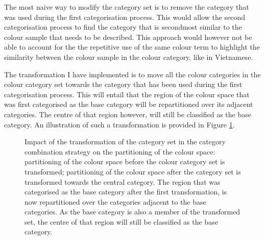 The most naive way to modify the category set is to remove the
category that was used during the first categorisation process. This
would allow the second categorisation process to find the category
that is secondmost similar to the colour sample that needs to be
described. This approach would however not be able to account for the
the repetitive use of the same colour term to highlight the similarity
between the colour sample in the colour category, like in Vietnamese.

The transformation I have implemented is to move all the colour
categories in the colour category set towards the category that has
been used during the first categorisation process. This will entail
that the region of the colour space that was first categorised as the
base category will be repartitioned over its adjacent categories. The
centre of that region however, will still be classified as the base
category. An illustration of such a transformation is provided in
Figure \ref{f:ccs-semantics-transformation}.

\begin{figure}[htbp]
\centering
{}
\caption[Impact of the transformation of the category set in the
category combination strategy on the partitioning of the colour
space]{Impact of the transformation of the category set in the
  category combination strategy on the partitioning of the
  colour space: 
  partitioning of the colour space before the colour category set is
  transformed;  partitioning of
  the colour space after the category set is transformed towards the
  central category. The region that was categorised as
  the base category after the first transformation, is now repartitioned over the categories adjacent
  to the base categories. As the base category is also a member of the
  transformed set, the centre of that region will still be classified
  as the base category.}
\label{f:ccs-semantics-transformation}
\end{figure}

